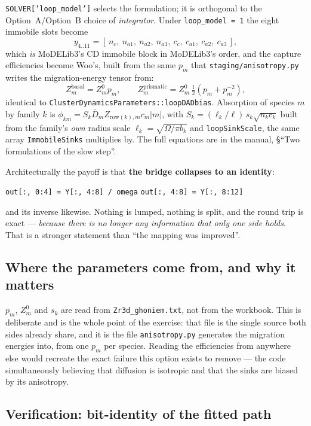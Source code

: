 \documentclass[11pt,a4paper]{article}
\newcommand{\code}[1]{\texttt{\small #1}}
\begin{document}
\code{SOLVER['loop\_model']} selects the formulation; it is orthogonal to the
Option~A/Option~B choice of \emph{integrator}. Under \code{loop\_model = 1} the
eight immobile slots become
%
\[
  y_{4..11} = [\,n_c,\ n_{a1},\ n_{a2},\ n_{a3},\
                 c_c,\ c_{a1},\ c_{a2},\ c_{a3}\,],
\]
%
which \emph{is} MoDELib3's CD immobile block in MoDELib3's order, and the capture
efficiencies become Woo's, built from the same $p_m$ that
\code{staging/anisotropy.py} writes the migration-energy tensor from:
%
\[
  Z^{\text{basal}}_{m} = Z^{0}_{m} p_m, \qquad
  Z^{\text{prismatic}}_{m} = Z^{0}_{m}\,\tfrac12\!\left(p_m + p_m^{-2}\right),
\]
%
identical to \code{ClusterDynamicsParameters::loopDADbias}. Absorption of
species $m$ by family $k$ is
$\phi_{km} = S_k \bar{D}_m Z_{\mathrm{row}(k),m} c_m |m|$, with
$S_k = (\ell_k/\ell)\,s_k\sqrt{n_k c_k}$ built from the family's \emph{own}
radius scale $\ell_k = \sqrt{\Omega/\pi b_k}$ and \code{loopSinkScale}, the same
array \code{ImmobileSinks} multiplies by. The full equations are in the manual,
\S``Two formulations of the slow step''.

Architecturally the payoff is that \textbf{the bridge collapses to an
identity}:
%
\begin{center}
\code{out[:, 0:4] = Y[:, 4:8] / omega} \qquad
\code{out[:, 4:8] = Y[:, 8:12]}
\end{center}
%
and its inverse likewise. Nothing is lumped, nothing is split, and the round
trip is exact --- \emph{because there is no longer any information that only one
side holds}. That is a stronger statement than ``the mapping was improved''.

\subsection{Where the parameters come from, and why it matters}

$p_m$, $Z^0_m$ and $s_k$ are read from \code{Zr3d\_ghoniem.txt}, not from the
workbook. This is deliberate and is the whole point of the exercise: that file
is the single source both sides already share, and it is the file
\code{anisotropy.py} generates the migration energies into, from one $p_m$ per
species. Reading the efficiencies from anywhere else would recreate the exact
failure this option exists to remove --- the code simultaneously believing that
diffusion is isotropic and that the sinks are biased by its anisotropy.

\subsection{Verification: bit-identity of the fitted path}
\end{document}
